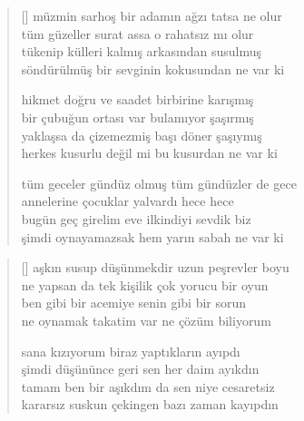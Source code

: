 \documentclass[10pt, openright, twoside]{memoir}
\theoremstyle{definition}
\begin{document}
\vspace*{\fill}
%
\newpage
{}
\vspace*{\fill}
\settowidth{\versewidth}{tüm geceler gündüz olmuş tüm gündüzler de gece}
\begin{verse}[\versewidth]
  müzmin sarhoş bir adamın ağzı tatsa ne olur \\
  tüm güzeller surat assa o rahatsız mı olur \\
  tükenip külleri kalmış arkasından susulmuş \\
  söndürülmüş bir sevginin kokusundan ne var ki

  hikmet doğru ve saadet birbirine karışmış \\
  bir çubuğun ortası var bulamıyor şaşırmış \\
  yaklaşsa da çizemezmiş başı döner şaşıymış \\
  herkes kusurlu değil mi bu kusurdan ne var ki

  tüm geceler gündüz olmuş tüm gündüzler de gece \\
  annelerine çocuklar yalvardı hece hece \\
  bugün geç girelim eve ilkindiyi sevdik biz \\
  şimdi oynayamazsak hem yarın sabah ne var ki \\
\end{verse}
\vspace*{\fill}
%
\newpage
{}
\vspace*{\fill}
\settowidth{\versewidth}{ne yapsan da tek kişilik çok yorucu bir oyun}
\begin{verse}[\versewidth]
  aşkın susup düşünmekdir uzun peşrevler boyu \\
  ne yapsan da tek kişilik çok yorucu bir oyun \\
  ben gibi bir acemiye senin gibi bir sorun \\
  ne oynamak takatim var ne çözüm biliyorum

  sana kızıyorum biraz yaptıkların ayıpdı \\
  şimdi düşününce geri sen her daim ayıkdın \\
  tamam ben bir aşıkdım da sen niye cesaretsiz \\
  kararsız suskun çekingen bazı zaman kayıpdın \\
\end{verse}
\vspace*{\fill}
%
\newpage
{}
\end{document}
